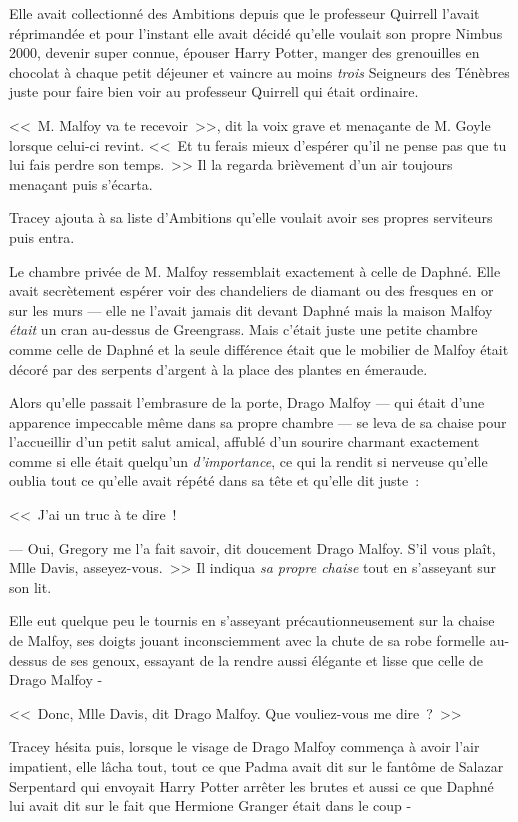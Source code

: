 Elle avait collectionné des Ambitions depuis que le professeur Quirrell l'avait réprimandée et pour l'instant elle avait décidé qu'elle voulait son propre Nimbus 2000, devenir super connue, épouser Harry Potter, manger des grenouilles en chocolat à chaque petit déjeuner et vaincre au moins \emph{trois} Seigneurs des Ténèbres juste pour faire bien voir au professeur Quirrell qui était ordinaire.

<<~M. Malfoy va te recevoir~>>, dit la voix grave et menaçante de M. Goyle lorsque celui-ci revint. <<~Et tu ferais mieux d'espérer qu'il ne pense pas que tu lui fais perdre son temps.~>> Il la regarda brièvement d'un air toujours menaçant puis s'écarta.

Tracey ajouta à sa liste d'Ambitions qu'elle voulait avoir ses propres serviteurs puis entra.

Le chambre privée de M. Malfoy ressemblait exactement à celle de Daphné. Elle avait secrètement espérer voir des chandeliers de diamant ou des fresques en or sur les murs — elle ne l'avait jamais dit devant Daphné mais la maison Malfoy \emph{était} un cran au-dessus de Greengrass. Mais c'était juste une petite chambre comme celle de Daphné et la seule différence était que le mobilier de Malfoy était décoré par des serpents d'argent à la place des plantes en émeraude.

Alors qu'elle passait l'embrasure de la porte, Drago Malfoy — qui était d'une apparence impeccable même dans sa propre chambre — se leva de sa chaise pour l'accueillir d'un petit salut amical, affublé d'un sourire charmant exactement comme si elle était quelqu'un \emph{d'importance}, ce qui la rendit si nerveuse qu'elle oublia tout ce qu'elle avait répété dans sa tête et qu'elle dit juste~:

<<~J'ai un truc à te dire~!

--- Oui, Gregory me l'a fait savoir, dit doucement Drago Malfoy. S'il vous plaît, Mlle Davis, asseyez-vous.~>> Il indiqua \emph{sa propre chaise} tout en s'asseyant sur son lit.

Elle eut quelque peu le tournis en s'asseyant précautionneusement sur la chaise de Malfoy, ses doigts jouant inconsciemment avec la chute de sa robe formelle au-dessus de ses genoux, essayant de la rendre aussi élégante et lisse que celle de Drago Malfoy -

<<~Donc, Mlle Davis, dit Drago Malfoy. Que vouliez-vous me dire~?~>>

Tracey hésita puis, lorsque le visage de Drago Malfoy commença à avoir l'air impatient, elle lâcha tout, tout ce que Padma avait dit sur le fantôme de Salazar Serpentard qui envoyait Harry Potter arrêter les brutes et aussi ce que Daphné lui avait dit sur le fait que Hermione Granger était dans le coup -


